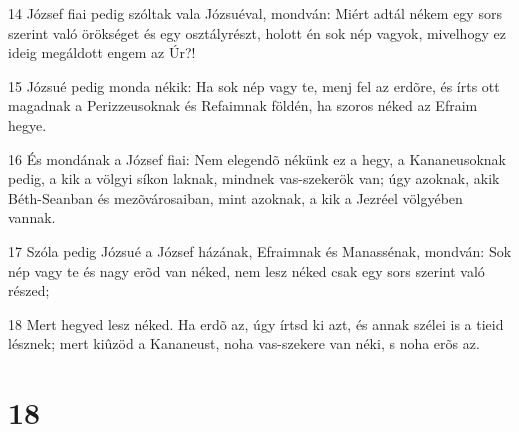\par 14 József fiai pedig szóltak vala Józsuéval, mondván: Miért adtál nékem egy sors szerint való örökséget és egy osztályrészt, holott én sok nép vagyok, mivelhogy ez ideig megáldott engem az Úr?!
\par 15 Józsué pedig monda nékik: Ha sok nép vagy te, menj fel az erdõre, és írts ott magadnak a Perizzeusoknak és Refaimnak földén, ha szoros néked az Efraim hegye.
\par 16 És mondának a József fiai: Nem elegendõ nékünk ez a hegy, a Kananeusoknak pedig, a kik a völgyi síkon laknak, mindnek vas-szekerök van; úgy azoknak, akik Béth-Seanban és mezõvárosaiban, mint azoknak, a kik a Jezréel völgyében vannak.
\par 17 Szóla pedig Józsué a József házának, Efraimnak és Manassénak, mondván: Sok nép vagy te és nagy erõd van néked, nem lesz néked csak egy sors szerint való részed;
\par 18 Mert hegyed lesz néked. Ha erdõ az, úgy írtsd ki azt, és annak szélei is a tieid lésznek; mert kiûzöd a Kananeust, noha vas-szekere van néki, s noha erõs az.

\chapter{18}

